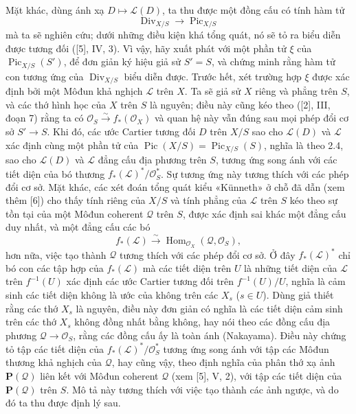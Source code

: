 Mặt khác, dùng ánh xạ $D\longmapsto\mathcal L(D)$, ta thu được một đồng cấu có
tính hàm tử
\begin{equation}
\operatorname{Div}_{X/S}\longrightarrow\operatorname{Pic}_{X/S}
\tag{+}
\end{equation}
mà ta sẽ nghiên cứu; dưới những điều kiện khá tổng quát, nó sẽ tỏ ra biểu diễn
được tương đối ([5], IV, 3). Vì vậy, hãy xuất phát với một phần tử $\xi$ của
$\operatorname{Pic}_{X/S}(S')$, để đơn giản ký hiệu giả sử $S'=S$, và chứng
minh rằng hàm tử con tương ứng của $\operatorname{Div}_{X/S}$ biểu diễn được.
Trước hết, xét trường hợp $\xi$ được xác định bởi một Môđun khả nghịch
$\mathcal L$ trên $X$. Ta sẽ giả sử $X$ riêng và phẳng trên $S$, và các thớ
hình học của $X$ trên $S$ là nguyên; điều này cũng kéo theo ([2], III, đoạn 7)
rằng ta có $\mathcal O_S\xrightarrow{\sim}f_*(\mathcal O_X)$ và quan hệ này
vẫn đúng sau mọi phép đổi cơ sở $S'\longrightarrow S$. Khi đó, các ước Cartier
tương đối $D$ trên $X/S$ sao cho $\mathcal L(D)$ và $\mathcal L$ xác định cùng
một phần tử của $\operatorname{Pic}(X/S)=\operatorname{Pic}_{X/S}(S)$, nghĩa
là theo 2.4, sao cho $\mathcal L(D)$ và $\mathcal L$ đẳng cấu địa phương trên
$S$, tương ứng song ánh với các tiết diện của bó thương
$f_*(\mathcal L)^*/\mathcal O_S^*$. Sự tương ứng này tương thích với các phép
đổi cơ sở. Mặt khác, các xét đoán tổng quát kiểu «Künneth» ở chỗ đã dẫn (xem
thêm [6]) cho thấy tính riêng của $X/S$ và tính phẳng của $\mathcal L$ trên
$S$ kéo theo sự tồn tại của một Môđun coherent $\mathcal Q$ trên $S$, được
xác định sai khác một đẳng cấu duy nhất, và một đẳng cấu các bó
\[
f_*(\mathcal L)\xrightarrow{\sim}
\operatorname{Hom}_{\mathcal O_X}(\mathcal Q,\mathcal O_S),
\]
 hơn nữa, việc tạo thành $\mathcal Q$ tương
thích với các phép đổi cơ sở. Ở đây $f_*(\mathcal L)^*$ chỉ bó con các tập hợp
của $f_*(\mathcal L)$ mà các tiết diện trên $U$ là những tiết diện của
$\mathcal L$ trên $f^{-1}(U)$ xác định các ước Cartier tương đối trên
$f^{-1}(U)/U$, nghĩa là cảm sinh các tiết diện không là ước của không trên các
$X_s$ ($s\in U$). Dùng giả thiết rằng các thớ $X_s$ là nguyên, điều này đơn
giản có nghĩa là các tiết diện cảm sinh trên các thớ $X_s$ không đồng nhất
bằng không, hay nói theo các đồng cấu địa phương
$\mathcal Q\longrightarrow\mathcal O_S$, rằng các đồng cấu ấy là toàn ánh
(Nakayama). Điều này chứng tỏ tập các tiết diện của
$f_*(\mathcal L)^*/\mathcal O_S^*$ tương ứng song ánh với tập các Môđun thương
khả nghịch của $\mathcal Q$, hay cũng vậy, theo định nghĩa của phân thớ xạ ảnh
$\mathbf P(\mathcal Q)$ liên kết với Môđun coherent $\mathcal Q$ (xem [5], V,
2), với tập các tiết diện của $\mathbf P(\mathcal Q)$ trên $S$. Mô tả này
tương thích với việc tạo thành các ảnh ngược, và do đó ta thu được định lý sau.

